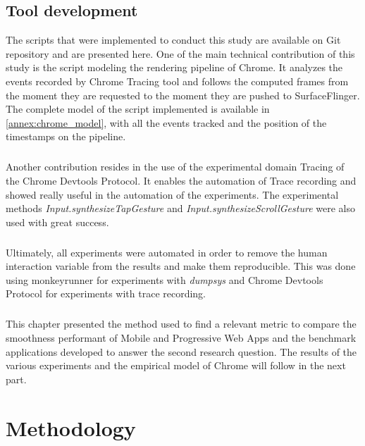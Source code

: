 \section{Tool development}

The scripts that were implemented to conduct this study are available on Git repository and are presented here. One of the main technical contribution of this study is the script modeling the rendering pipeline of Chrome. It analyzes the events recorded by Chrome Tracing tool and follows the computed frames from the moment they are requested to the moment they are pushed to SurfaceFlinger. The complete model of the script implemented is available in \autoref{annex:chrome_model}, with all the events tracked and the position of the timestamps on the pipeline.
\paragraph{}
Another contribution resides in the use of the experimental domain Tracing of the Chrome Devtools Protocol. It enables the automation of Trace recording and showed really useful in the automation of the experiments. The experimental methods \textit{Input.synthesizeTapGesture} and \textit{Input.synthesizeScrollGesture} were also used with great success.
\paragraph{}
Ultimately, all experiments were automated in order to remove the human interaction variable from the results and make them reproducible. This was done using monkeyrunner for experiments with \textit{dumpsys} and Chrome Devtools Protocol for experiments with trace recording.

\paragraph{}
This chapter presented the method used to find a relevant metric to compare the smoothness performant of Mobile and Progressive Web Apps and the benchmark applications developed to answer the second research question. The results of the various experiments and the empirical model of Chrome will follow in the next part.



\chapter{Methodology}

